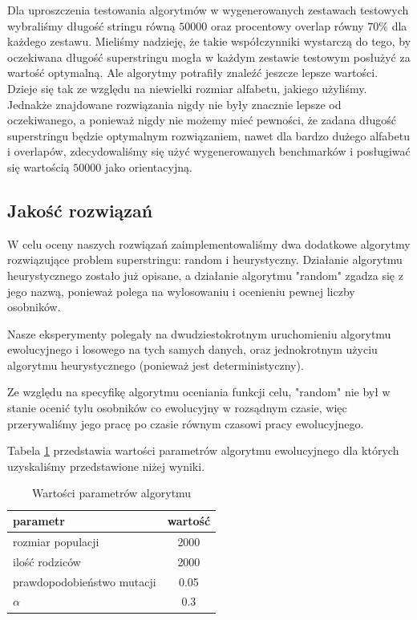 \documentclass[11pt, a4wide]{mwart}
\begin{document}
Dla uproszczenia testowania algorytmów w wygenerowanych zestawach
testowych wybraliśmy długość stringu równą $50000$ oraz procentowy
overlap równy $70\%$ dla każdego zestawu.  Mieliśmy nadzieję, że takie
współczynniki wystarczą do tego, by oczekiwana długość superstringu
mogła w każdym zestawie testowym posłużyć za wartość optymalną. Ale
algorytmy potrafiły znaleźć jeszcze lepsze wartości. Dzieje się tak ze
względu na niewielki rozmiar alfabetu, jakiego użyliśmy.  Jednakże
znajdowane rozwiązania nigdy nie były znacznie lepsze od oczekiwanego,
a ponieważ nigdy nie możemy mieć pewności, że zadana długość
superstringu będzie optymalnym  rozwiązaniem, nawet dla bardzo dużego
alfabetu i overlapów, zdecydowaliśmy się użyć wygenerowanych
benchmarków i posługiwać się wartością $50000$ jako orientacyjną.





\subsection{Jakość rozwiązań}
W celu oceny naszych rozwiązań zaimplementowaliśmy dwa dodatkowe algorytmy
rozwiązujące problem superstringu: random i heurystyczny. Działanie algorytmu
heurystycznego zostało już opisane, a działanie algorytmu "random" zgadza się z
jego nazwą, ponieważ polega na wylosowaniu i ocenieniu pewnej liczby osobników.

Nasze eksperymenty polegały na dwudziestokrotnym uruchomieniu algorytmu
ewolucyjnego i losowego na tych samych danych, oraz jednokrotnym użyciu
algorytmu heurystycznego (ponieważ jest deterministyczny). 

Ze względu na specyfikę algorytmu oceniania funkcji celu, "random" nie był w
stanie ocenić tylu osobników co ewolucyjny w rozsądnym czasie, więc
przerywaliśmy jego pracę po czasie równym czasowi pracy ewolucyjnego. 

Tabela \ref{parametry} przedstawia wartości parametrów algorytmu ewolucyjnego 
dla których uzyskaliśmy przedstawione niżej wyniki.

\begin{table}[H]
\caption{Wartości parametrów algorytmu}
\label{parametry}
\begin{center}
\begin{tabular}{l|c}
  \hline
  parametr & wartość \\
  \hline
  rozmiar populacji & 2000 \\
  ilość rodziców & 2000 \\
  prawdopodobieństwo mutacji & 0.05 \\
  $\alpha$ & 0.3 \\
  \hline
\end{tabular}
\end{center}
\end{table}
\end{document}
